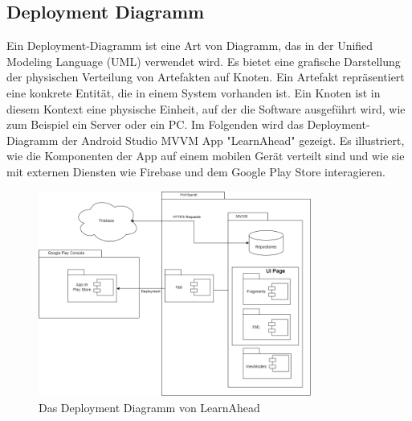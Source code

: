 \subsection{Deployment Diagramm} \label{Deployment Diagramm}
Ein Deployment-Diagramm ist eine Art von Diagramm, das in der Unified Modeling Language (UML) verwendet wird. Es bietet eine grafische Darstellung der physischen Verteilung von Artefakten auf Knoten. Ein Artefakt repräsentiert eine konkrete Entität, die in einem System vorhanden ist. Ein Knoten ist in diesem Kontext eine physische Einheit, auf der die Software ausgeführt wird, wie zum Beispiel ein Server oder ein PC.\newline
Im Folgenden wird das Deployment-Diagramm der Android Studio MVVM App "LearnAhead" gezeigt. Es illustriert, wie die Komponenten der App auf einem mobilen Gerät verteilt sind und wie sie mit externen Diensten wie Firebase und dem Google Play Store interagieren.\newline
\begin{figure}[H]
    \centering
    \includegraphics[width=0.8\textwidth]{images/diagramme/DeploymentDiagramm.png}
    \caption{Das Deployment Diagramm von LearnAhead}
    \label{fig:DeploymentDiagramm}
\end{figure}

